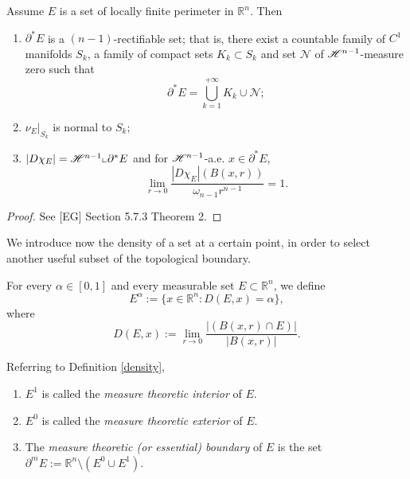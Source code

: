 \begin{theorem} \label{structhm1} Assume $E$ is a set of locally finite perimeter in $\mathbb{R}^{n}$. Then
\begin{enumerate}
	\item $\partial^{*}E$ is a $(n-1)$-rectifiable set; that is, there exist a countable family of $C^{1}$ manifolds $S_{k}$, a family of compact sets $K_{k} \subset S_{k}$ and set $\mathcal{N}$ of $\mathscr{H}^{n-1}$-measure zero such that
\[ \partial^{*}E = \bigcup_{k=1}^{+\infty} K_{k} \cup \mathcal{N}; \]
	\item $\nu_{E} |_{S_{k}}$ is normal to $S_{k};$
	\item $|D\chi_{E}| = \mathscr{H}^{n-1} \llcorner \partial^{*}E$ and for $\mathscr{H}^{n - 1}$-a.e. $x \in \partial^{*}E$,
\[ \lim_{r \to 0 } \frac{|D\chi_{E}|(B(x,r))}{\omega_{n-1}r^{n - 1}} = 1. \]
\end{enumerate}
\end{theorem}
\begin{proof} See [EG] Section 5.7.3 Theorem 2.
\end{proof}

We introduce now the density of a set at a certain point, in order to select another useful subset of the topological boundary.

\begin{definition} \label{density} For every $\alpha \in [0, 1]$ and every measurable set $E \subset \mathbb{R}^{n}$, we define
\[ E^{\alpha} := \{ x \in \mathbb{R}^{n} : D(E, x) = \alpha \}, \]
where
\[ D(E, x) := \lim_{r \to 0} \frac{|(B(x,r) \cap E)|}{|B(x,r)|}.  \]
\end{definition}

\begin{definition} \label{measuretheorintext} Referring to Definition \ref{density},
\begin{enumerate}
	\item $E^{1}$ is called the {\em measure theoretic interior} of $E$.
	\item $E^{0}$ is called the {\em measure theoretic exterior} of $E$.
	\item The {\em measure theoretic (or essential) boundary} of $E$ is the set $\partial^{m}E := \mathbb{R}^{n} \setminus (E^{0} \cup E^{1})$.
\end{enumerate}
\end{definition}

